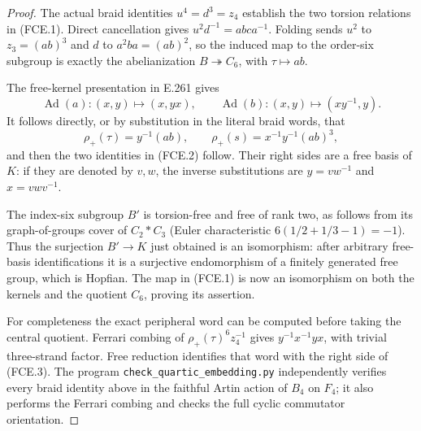 \begin{proof}
The actual braid identities $u^4=d^3=z_4$ establish the two torsion
relations in (FCE.1).  Direct cancellation gives
$u^2d^{-1}=abc a^{-1}$.  Folding sends $u^2$ to $z_3=(ab)^3$
and $d$ to $a^2ba=(ab)^2$, so the induced map to the order-six
subgroup is exactly the abelianization $B\twoheadrightarrow C_6$,
with $\tau\mapsto ab$.

The free-kernel presentation in E.261 gives
\[
 \operatorname{Ad}(a):(x,y)\longmapsto(x,yx),\qquad
 \operatorname{Ad}(b):(x,y)\longmapsto(xy^{-1},y).
\]
It follows directly, or by substitution in the literal braid words,
that
\[
 \rho_+(\tau)=y^{-1}(ab),\qquad
 \rho_+(s)=x^{-1}y^{-1}(ab)^3,
\]
and then the two identities in (FCE.2) follow.  Their right sides
are a free basis of $K$: if they are denoted by $v,w$, the inverse
substitutions are $y=vw^{-1}$ and $x=vwv^{-1}$.

The index-six subgroup $B'$ is torsion-free and free of rank two,
as follows from its graph-of-groups cover of $C_2*C_3$ (Euler
characteristic $6(1/2+1/3-1)=-1$).  Thus the surjection
$B'\to K$ just obtained is an isomorphism: after arbitrary free-basis
identifications it is a surjective endomorphism of a finitely
generated free group, which is Hopfian.  The map in (FCE.1) is now
an isomorphism on both the kernels and the quotient $C_6$, proving
its assertion.

For completeness the exact peripheral word can be computed before
taking the central quotient.  Ferrari combing of
$\rho_+(\tau)^6z_4^{-1}$ gives $y^{-1}x^{-1}yx$, with trivial
three-strand factor.  Free reduction identifies that word with the
right side of (FCE.3).  The program
\texttt{check\_quartic\_embedding.py} independently verifies every
braid identity above in the faithful Artin action of $B_4$ on $F_4$;
it also performs the Ferrari combing and checks the full cyclic
commutator orientation.


\end{proof}
